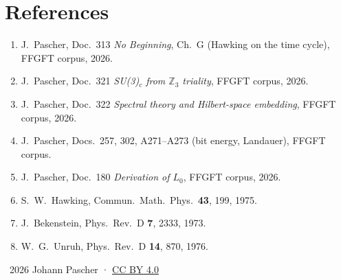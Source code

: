 \section*{References}

\begin{enumerate}
  \item J.\ Pascher, Doc.\ 313 \textit{No Beginning}, Ch.\ G (Hawking on the time cycle), FFGFT corpus, 2026.
  \item J.\ Pascher, Doc.\ 321 \textit{SU(3)$_c$ from $\mathbb{Z}_3$ triality}, FFGFT corpus, 2026.
  \item J.\ Pascher, Doc.\ 322 \textit{Spectral theory and Hilbert-space embedding}, FFGFT corpus, 2026.
  \item J.\ Pascher, Docs.\ 257, 302, A271--A273 (bit energy, Landauer), FFGFT corpus.
  \item J.\ Pascher, Doc.\ 180 \textit{Derivation of $L_0$}, FFGFT corpus, 2026.
  \item S.\ W.\ Hawking, Commun.\ Math.\ Phys.\ \textbf{43}, 199, 1975.
  \item J.\ Bekenstein, Phys.\ Rev.\ D \textbf{7}, 2333, 1973.
  \item W.\ G.\ Unruh, Phys.\ Rev.\ D \textbf{14}, 870, 1976.
\end{enumerate}

\vspace{6pt}\noindent\small
\textcopyright\ 2026 Johann Pascher · \href{https://creativecommons.org/licenses/by/4.0/}{CC BY 4.0}
